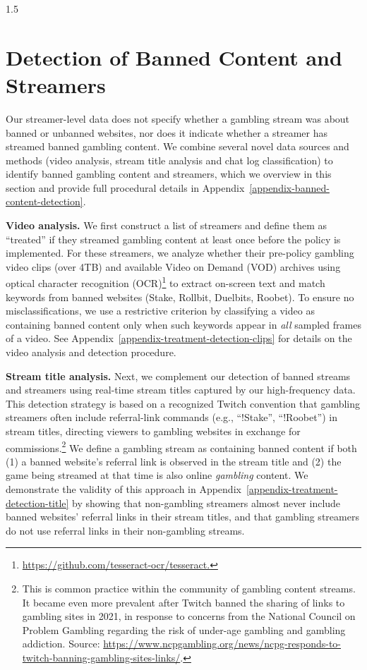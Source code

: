 \documentclass[a4paper,12pt]{article}
\begin{document}
\begin{spacing}{1.5}
\section{Detection of Banned Content and Streamers} \label{section-treatment-detection}
Our streamer-level data does not specify whether a gambling stream was about banned or unbanned websites, nor does it indicate whether a streamer has streamed banned gambling content.
We combine several novel data sources and methods (video analysis, stream title analysis and chat log classification) to identify banned gambling content and streamers, which we overview in this section and provide full procedural details in Appendix~\ref{appendix-banned-content-detection}.

\noindent \textbf{Video analysis.}
We first construct a list of streamers and define them as ``treated'' if they streamed gambling content at least once before the policy is implemented. For these streamers, we analyze whether their pre-policy gambling video clips (over 4TB) and available Video on Demand (VOD) archives using optical character recognition (OCR)\footnote{\url{https://github.com/tesseract-ocr/tesseract.}} to extract on-screen text and match keywords from banned websites (Stake, Rollbit, Duelbits, Roobet). To ensure no misclassifications, we use a restrictive criterion by classifying a video as containing banned content only when such keywords appear in \textit{all} sampled frames of a video. See Appendix~\ref{appendix-treatment-detection-clips} for details on the video analysis and detection procedure. 

\noindent \textbf{Stream title analysis.} Next, we complement our detection of banned streams and streamers using real-time stream titles captured by our high-frequency data. This detection strategy is based on a recognized Twitch convention that gambling streamers often include referral-link commands (e.g., ``!Stake'', ``!Roobet'') in stream titles, directing viewers to gambling websites in exchange for commissions.\footnote{This is common practice within the community of gambling content streams. It became even more prevalent after Twitch banned the sharing of links to gambling sites in 2021, in response to concerns from the National Council on Problem Gambling regarding the risk of under-age gambling and gambling addiction. Source: \url{https://www.ncpgambling.org/news/ncpg-responds-to-twitch-banning-gambling-sites-links/}.} We define a gambling stream as containing banned content if both (1) a banned website's referral link is observed in the stream title and (2) the game being streamed at that time is also online \textit{gambling} content. We demonstrate the validity of this approach in Appendix~\ref{appendix-treatment-detection-title} by showing that non-gambling streamers almost never include banned websites' referral links in their stream titles, and that gambling streamers do not use referral links in their non-gambling streams. 


\end{spacing}
\end{document}
